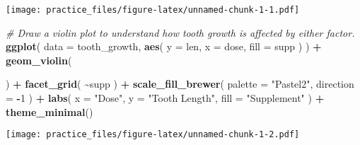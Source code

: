 \documentclass[
]{article}
\newenvironment{Shaded}{\begin{snugshade}}{\end{snugshade}}
\newcommand{\AttributeTok}[1]{\textcolor[rgb]{0.13,0.29,0.53}{#1}}
\newcommand{\CommentTok}[1]{\textcolor[rgb]{0.56,0.35,0.01}{\textit{#1}}}
\newcommand{\DecValTok}[1]{\textcolor[rgb]{0.00,0.00,0.81}{#1}}
\newcommand{\FunctionTok}[1]{\textcolor[rgb]{0.13,0.29,0.53}{\textbf{#1}}}
\newcommand{\NormalTok}[1]{#1}
\newcommand{\SpecialCharTok}[1]{\textcolor[rgb]{0.81,0.36,0.00}{\textbf{#1}}}
\newcommand{\StringTok}[1]{\textcolor[rgb]{0.31,0.60,0.02}{#1}}
\begin{document}
\texttt{[image: practice\_files/figure-latex/unnamed-chunk-1-1.pdf]}

\begin{Shaded}
\begin{Highlighting}[]
\CommentTok{\# Draw a violin plot to understand how tooth growth is affected by either factor.}
\FunctionTok{ggplot}\NormalTok{(}
  \AttributeTok{data =}\NormalTok{ tooth\_growth,}
  \FunctionTok{aes}\NormalTok{(    }\AttributeTok{y =} \StringTok{\textasciigrave{}}\AttributeTok{len}\StringTok{\textasciigrave{}}\NormalTok{,    }\AttributeTok{x =} \StringTok{\textasciigrave{}}\AttributeTok{dose}\StringTok{\textasciigrave{}}\NormalTok{,    }\AttributeTok{fill =} \StringTok{\textasciigrave{}}\AttributeTok{supp}\StringTok{\textasciigrave{}}\NormalTok{  )}
\NormalTok{) }\SpecialCharTok{+} \FunctionTok{geom\_violin}\NormalTok{(}
  
\NormalTok{) }\SpecialCharTok{+} \FunctionTok{facet\_grid}\NormalTok{(}
  \SpecialCharTok{\textasciitilde{}}\StringTok{\textasciigrave{}}\AttributeTok{supp}\StringTok{\textasciigrave{}}
\NormalTok{) }\SpecialCharTok{+} \FunctionTok{scale\_fill\_brewer}\NormalTok{(  }\AttributeTok{palette =} \StringTok{"Pastel2"}\NormalTok{,  }\AttributeTok{direction =} \SpecialCharTok{{-}}\DecValTok{1}
\NormalTok{) }\SpecialCharTok{+} \FunctionTok{labs}\NormalTok{(  }\AttributeTok{x =} \StringTok{"Dose"}\NormalTok{,  }\AttributeTok{y =} \StringTok{"Tooth Length"}\NormalTok{,  }\AttributeTok{fill =} \StringTok{"Supplement"}
\NormalTok{) }\SpecialCharTok{+} \FunctionTok{theme\_minimal}\NormalTok{()}
\end{Highlighting}
\end{Shaded}

\texttt{[image: practice\_files/figure-latex/unnamed-chunk-1-2.pdf]}
\end{document}
